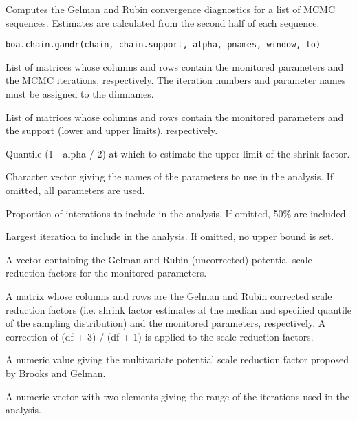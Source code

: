 \begin{Description}\relax
Computes the Gelman and Rubin convergence diagnostics for a list of MCMC
sequences. Estimates are calculated from the second half of each sequence.
\end{Description}
\begin{Usage}
\begin{verbatim}
boa.chain.gandr(chain, chain.support, alpha, pnames, window, to)
\end{verbatim}
\end{Usage}
\begin{Arguments}
\begin{ldescription}
\item[\code{chain}] List of matrices whose columns and rows contain the monitored
parameters and the MCMC iterations, respectively. The iteration numbers and
parameter names must be assigned to the dimnames.
\item[\code{chain.support}] List of matrices whose columns and rows contain the
monitored parameters and the support (lower and upper limits), respectively.
\item[\code{alpha}] Quantile (1 - alpha / 2) at which to estimate the upper limit of
the shrink factor.
\item[\code{pnames}] Character vector giving the names of the parameters to use in
the analysis. If omitted, all parameters are used.
\item[\code{window}] Proportion of interations to include in the analysis. If
omitted, 50\% are included.
\item[\code{to}] Largest iteration to include in the analysis. If omitted, no upper
bound is set.
\end{ldescription}
\end{Arguments}
\begin{Value}
\begin{ldescription}
\item[\code{psrf}] A vector containing the Gelman and Rubin (uncorrected) potential
scale reduction factors for the monitored parameters.
\item[\code{csrf}] A matrix whose columns and rows are the Gelman and Rubin corrected
scale reduction factors (i.e. shrink factor estimates at the median and
specified quantile of the sampling distribution) and the monitored parameters,
respectively. A correction of (df + 3) / (df + 1) is applied to the scale
reduction factors.
\item[\code{mpsrf}] A numeric value giving the multivariate potential scale reduction
factor proposed by Brooks and Gelman.
\item[\code{window}] A numeric vector with two elements giving the range of the
iterations used in the analysis.
\end{ldescription}
\end{Value}
